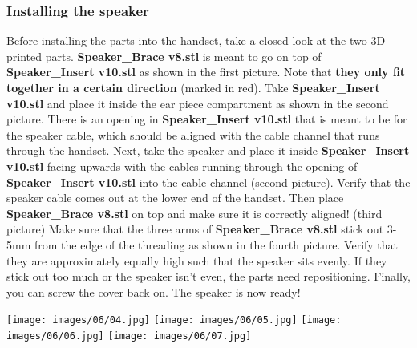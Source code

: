\documentclass[]{article}
\begin{document}
\subsubsection{Installing the speaker}
\begin{minipage}[t]{0.4\linewidth}
	\vspace{0pt}
	Before installing the parts into the handset, take a closed look at the two 3D-printed parts. \textbf{Speaker\_Brace v8.stl} is meant to go on top of \textbf{Speaker\_Insert v10.stl} as shown in the first picture. Note that \textbf{they only fit together in a certain direction} (marked in red). 
	\newline
	\newline
	Take \textbf{Speaker\_Insert v10.stl} and place it inside the ear piece compartment as shown in the second picture. There is an opening in \textbf{Speaker\_Insert v10.stl} that is meant to be for the speaker cable, which should be aligned with the cable channel that runs through the handset. 
	\newline
	\newline
	Next, take the speaker and place it inside \textbf{Speaker\_Insert v10.stl} facing upwards with the cables running through the opening of \textbf{Speaker\_Insert v10.stl} into the cable channel (second picture). Verify that the speaker cable comes out at the lower end of the handset.
	\newline
	\newline
	Then place \textbf{Speaker\_Brace v8.stl} on top and make sure it is correctly aligned! (third picture)
	\newline
	\newline
	Make sure that the three arms of \textbf{Speaker\_Brace v8.stl} stick out 3-5mm from the edge of the threading as shown in the fourth picture. Verify that they are approximately equally high such that the speaker sits evenly. If they stick out too much or the speaker isn't even, the parts need repositioning. 
	\newline
	\newline
	Finally, you can screw the cover back on. The speaker is now ready!
\end{minipage}
\hfill
\begin{minipage}[t]{0.3\linewidth}
	\vspace{0pt}
	\texttt{[image: images/06/04.jpg]}
	\texttt{[image: images/06/05.jpg]}
	\texttt{[image: images/06/06.jpg]}
	\texttt{[image: images/06/07.jpg]}
\end{minipage}
\end{document}
